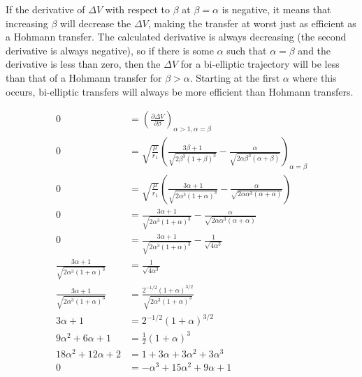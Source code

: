 \documentclass[../main.tex]{subfiles}
\begin{document}
If the derivative of $\Delta V$ with respect to $\beta$ at $\beta=\alpha$ is negative, it means that increasing $\beta$ will decrease the $\Delta V$, making the transfer at worst just as efficient as a Hohmann transfer. The calculated derivative is always decreasing (the second derivative is always negative), so if there is some $\alpha$ such that $\alpha=\beta$ and the derivative is less than zero, then the $\Delta V$ for a bi-elliptic trajectory will be less than that of a Hohmann transfer for $\beta>\alpha$. Starting at the first $\alpha$ where this occurs, bi-elliptic transfers will always be more efficient than Hohmann transfers.

\begin{align*}
    0                                              & = \left(\frac{\partial\Delta V}{\partial\beta}\right)_{\alpha>1,\alpha=\beta}                                                                      \\
    0                                              & = \sqrt{\frac{\mu}{r_1}}\left(\frac{3\beta+1}{\sqrt{2\beta^3(1+\beta)^3}}-\frac{\alpha}{\sqrt{2\alpha\beta^3(\alpha+\beta)}}\right)_{\alpha=\beta} \\
    0                                              & =\sqrt{\frac{\mu}{r_1}}\left(\frac{3\alpha+1}{\sqrt{2\alpha^3(1+\alpha)^3}}-\frac{\alpha}{\sqrt{2\alpha\alpha^3(\alpha+\alpha)}}\right)            \\
    0                                              & =\frac{3\alpha+1}{\sqrt{2\alpha^3(1+\alpha)^3}}-\frac{\alpha}{\sqrt{2\alpha\alpha^3(\alpha+\alpha)}}                                               \\
    0                                              & =\frac{3\alpha+1}{\sqrt{2\alpha^3(1+\alpha)^3}}-\frac{1}{\sqrt{4\alpha^3}}                                                                         \\
    \frac{3\alpha+1}{\sqrt{2\alpha^3(1+\alpha)^3}} & =\frac{1}{\sqrt{4\alpha^3}}                                                                                                                        \\
    \frac{3\alpha+1}{\sqrt{2\alpha^3(1+\alpha)^3}} & =\frac{2^{-1/2}(1+\alpha)^{3/2}}{\sqrt{2\alpha^3(1+\alpha)^3}}                                                                                     \\
    3\alpha+1                                      & =2^{-1/2}(1+\alpha)^{3/2}                                                                                                                          \\
    9\alpha^2+6\alpha+1                            & =\frac{1}{2}(1+\alpha)^3                                                                                                                           \\
    18\alpha^2+12\alpha+2                          & =1+3\alpha+3\alpha^2+3\alpha^3                                                                                                                     \\
    0                                              & =-\alpha^3+15\alpha^2+9\alpha+1
\end{align*}
\end{document}
